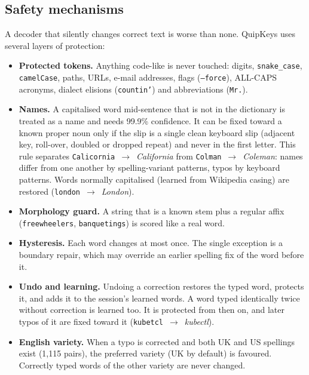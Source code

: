 \documentclass[11pt,a4paper]{article}
\newcommand{\qk}{QuipKeys}
\newcommand{\ttw}[1]{\texttt{#1}}
\begin{document}
\subsection{Safety mechanisms}
\label{sec:safety}
A decoder that silently changes correct text is worse than none. \qk{} uses several layers of protection:
\begin{itemize}
\item \textbf{Protected tokens.} Anything code-like is never touched: digits, \ttw{snake\_case}, \ttw{camelCase}, paths, URLs, e-mail addresses, flags (\ttw{--force}), ALL-CAPS acronyms, dialect elisions (\ttw{countin'}) and abbreviations (\ttw{Mr.}).
\item \textbf{Names.} A capitalised word mid-sentence that is not in the dictionary is treated as a name and needs 99.9\% confidence. It can be fixed toward a known proper noun only if the slip is a single clean keyboard slip (adjacent key, roll-over, doubled or dropped repeat) and never in the first letter. This rule separates \ttw{Calicornia}~$\to$~\emph{California} from \ttw{Colman}~$\to$~\emph{Coleman}: names differ from one another by spelling-variant patterns, typos by keyboard patterns. Words normally capitalised (learned from Wikipedia casing) are restored (\ttw{london}~$\to$~\emph{London}).
\item \textbf{Morphology guard.} A string that is a known stem plus a regular affix (\ttw{freewheelers}, \ttw{banquetings}) is scored like a real word.
\item \textbf{Hysteresis.} Each word changes at most once. The single exception is a boundary repair, which may override an earlier spelling fix of the word before it.
\item \textbf{Undo and learning.} Undoing a correction restores the typed word, protects it, and adds it to the session's learned words. A word typed identically twice without correction is learned too. It is protected from then on, and later typos of it are fixed toward it (\ttw{kubetcl}~$\to$~\emph{kubectl}).
\item \textbf{English variety.} When a typo is corrected and both UK and US spellings exist (1,115 pairs), the preferred variety (UK by default) is favoured. Correctly typed words of the other variety are never changed.
\end{itemize}
\end{document}
